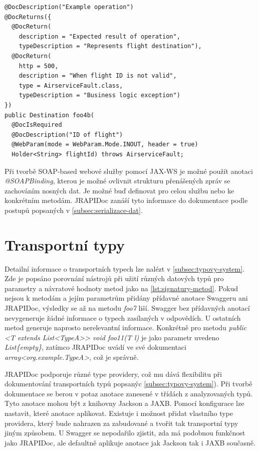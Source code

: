 \documentclass[11pt,twoside,a4paper]{book}
\begin{document}
\begin{lstlisting}[frame=single, caption={SOAP-based webové služby metoda s užitím JRAPIDoc
anotací}, label={lst:soap-metoda-jrapidoc-ukazka}] 
@DocDescription("Example operation") 
@DocReturns({
  @DocReturn(
    description = "Expected result of operation", 
    typeDescription = "Represents flight destination"), 
  @DocReturn(
    http = 500, 
    description = "When flight ID is not valid", 
    type = AirserviceFault.class, 
    typeDescription = "Business logic exception")
}) 
public Destination foo4b(
  @DocIsRequired 
  @DocDescription("ID of flight")
  @WebParam(mode = WebParam.Mode.INOUT, header = true) 
  Holder<String> flightId) throws AirserviceFault;
\end{lstlisting}

Při tvorbě SOAP-based webové služby pomocí JAX-WS je možné použít anotaci {\em
@SOAPBinding}, kterou je možné ovlivnit strukturu přenášených zpráv se
zachováním nosných dat. Je možné buď definovat pro celou službu nebo ke
konkrétním metodám. JRAPIDoc zanáší tyto informace do dokumentace podle postupů
popsaných v \ref{subsec:serializace-dat}.

\section{Transportní typy}

Detailní informace o transportních typech lze nalézt v
\ref{subsec:typovy-system}.
Zde je popsáno porovnání nástrojů při užití různých datových typů pro parametry
a návratové hodnoty metod jako na \ref{lst:signatury-metod}. Pokud nejsou k
metodám a jejím parametrům přidány přídavné anotace Swaggeru ani JRAPIDoc,
výsledky se až na metodu {\em foo7} liší. Swagger bez přídavných anotací
nevygeneruje žádné informace o typech zasílaných v odpovědích. U ostatních metod
generuje naprosto nerelevantní informace. Konkrétně pro metodu {\em public <T
extends List<TypeA>> void foo11(T l)} je jako parametr uvedeno {\em
List\{empty\}}, zatímco JRAPIDoc uvádí ve své dokumentaci {\em
array<org.example.TypeA>}, což je správně.

JRAPIDoc podporuje různé type providery, což mu dává flexibilitu při
dokumentování transportních typů popsanýc \ref{subsec:typovy-system}). Při
tvorbě dokumentace se berou v potaz anotace zanesené v třídách z analyzovaných
typů. Tyto anotace mohou být z knihovny Jackson a JAXB. Pomocí konfigurace lze
nastavit, které anotace aplikovat. Existuje i možnost přidat vlastního type
providera, který bude nahrazen za zabudované a tvořit tak transportní typy jiným
způsobem.
U Swagger se nepodařilo zjistit, zda má podobnou funkčnost jako JRAPIDoc, ale
defaultně aplikuje anotace jak Jackson tak i JAXB současně.
\end{document}
